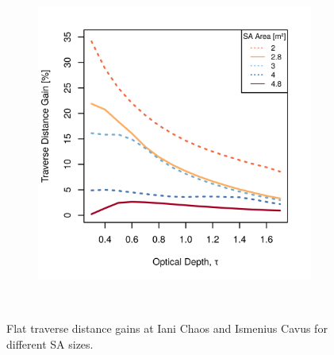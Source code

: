 \begin{figure}[h]
\begin{subfigure}[t]{\subfigureWidth}
        \includegraphics[height=\graphicsHeight]{sections/design/solar-array/plots/ismeniuscavus-75w-traverse-gains-for-different-sa-areas.png}
		\label{fig:plot:sub:iani-chaos-flat-traverse-gains-for-different-sa-area}
	\end{subfigure}\\[0.8ex]
    \caption[Flat traverse distance gains at Iani Chaos and Ismenius Cavus for different \ac{SA} sizes]
            {Flat traverse distance gains at Iani Chaos and Ismenius Cavus for different \ac{SA} sizes.}
    \label{fig:plot:flat-traverse-gains-for-different-sa-area}
\vspace{-2ex}
\end{figure}

